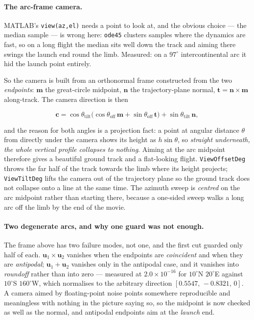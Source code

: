 \documentclass[11pt]{article}
\newcommand{\code}[1]{\texttt{#1}}
\begin{document}
\paragraph{The arc-frame camera.} MATLAB's \code{view(az,el)} needs a point to
look at, and the obvious choice --- the median sample --- is wrong here:
\code{ode45} clusters samples where the dynamics are fast, so on a long flight
the median sits well down the track and aiming there swings the launch end
round the limb. Measured: on a $97^\circ$ intercontinental arc it hid the
launch point entirely.

So the camera is built from an orthonormal frame constructed from the two
\emph{endpoints}: $\mathbf{m}$ the great-circle midpoint, $\mathbf{n}$ the
trajectory-plane normal, $\mathbf{t} = \mathbf{n}\times\mathbf{m}$
along-track. The camera direction is then

\[
  \mathbf{c} = \cos\theta_{\text{tilt}}
               \bigl(\cos\theta_{\text{off}}\,\mathbf{m}
                   + \sin\theta_{\text{off}}\,\mathbf{t}\bigr)
             + \sin\theta_{\text{tilt}}\,\mathbf{n},
\]

and the reason for both angles is a projection fact: a point at angular
distance $\theta$ from directly under the camera shows its height as
$h\sin\theta$, so \emph{straight underneath, the whole vertical profile
collapses to nothing}. Aiming at the arc midpoint therefore gives a beautiful
ground track and a flat-looking flight. \code{ViewOffsetDeg} throws the far
half of the track towards the limb where its height projects;
\code{ViewTiltDeg} lifts the camera out of the trajectory plane so the ground
track does not collapse onto a line at the same time. The azimuth sweep is
\emph{centred} on the arc midpoint rather than starting there, because a
one-sided sweep walks a long arc off the limb by the end of the movie.

\paragraph{Two degenerate arcs, and why one guard was not enough.} The frame
above has two failure modes, not one, and the first cut guarded only half of
each. $\mathbf{u}_1\times\mathbf{u}_2$ vanishes when the endpoints are
\emph{coincident} and when they are \emph{antipodal}; $\mathbf{u}_1+\mathbf{u}_2$
vanishes only in the antipodal case, and it vanishes into \emph{roundoff}
rather than into zero --- measured at $2.0\times10^{-16}$ for $10^\circ$N
$20^\circ$E against $10^\circ$S $160^\circ$W, which normalises to the arbitrary
direction $[0.5547,\,-0.8321,\,0]$. A camera aimed by floating-point noise
points somewhere reproducible and meaningless with nothing in the picture
saying so, so the midpoint is now checked as well as the normal, and antipodal
endpoints aim at the \emph{launch} end.
\end{document}

